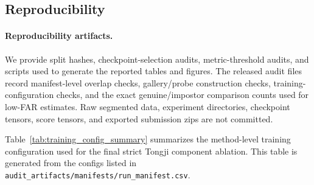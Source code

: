 \subsection{Reproducibility}

\paragraph{Reproducibility artifacts.}
We provide split hashes, checkpoint-selection audits, metric-threshold audits, and scripts used to generate the reported tables and figures. The released audit files record manifest-level overlap checks, gallery/probe construction checks, training-configuration checks, and the exact genuine/impostor comparison counts used for low-FAR estimates. Raw segmented data, experiment directories, checkpoint tensors, score tensors, and exported submission zips are not committed.



Table~\ref{tab:training_config_summary} summarizes the method-level training configuration used for the final strict Tongji component ablation. This table is generated from the configs listed in \texttt{audit\_artifacts/manifests/run\_manifest.csv}.
